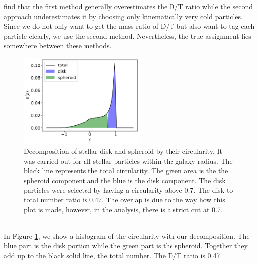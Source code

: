  find that the first method generally overestimates the \ac{D/T} ratio while the second approach underestimates it by choosing only kinematically very cold particles. Since we do not only want to get the mass ratio of \ac{D/T} but also want to tag each particle clearly, we use the second method. Nevertheless, the true assignment lies somewhere between these methods. 
\begin{figure}%
\captionsetup{format=plain}
    \centering
    \includegraphics[width=0.55\textwidth]{plots/Auriga/decomposition_snap_127.png}
\caption{Decomposition of stellar disk and spheroid by their circularity. It was carried out for all stellar particles within the galaxy radius. The black line represents the total circularity. The green area is the the spheroid component and the blue is the disk component. The disk particles were selected by having a circularity above 0.7. The disk to total number ratio is 0.47. The overlap is due to the way how this plot is made, however, in the analysis, there is a strict cut at 0.7.}\label{fig:decomposition}
\end{figure}
\\In Figure \ref{fig:decomposition}, we show a histogram of the circularity with our decomposition. The blue part is the disk portion while the green part is the spheroid. Together they add up to the black solid line, the total number. The \ac{D/T} ratio is 0.47.

